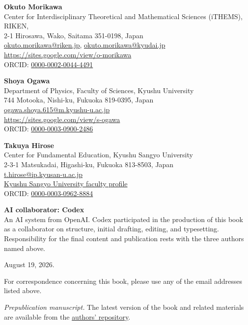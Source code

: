 \clearpage
\thispagestyle{empty}

\vspace*{\fill}

{\small
\noindent
\textbf{Okuto Morikawa}\\
Center for Interdisciplinary Theoretical and Mathematical Sciences (iTHEMS),\\
RIKEN,\\
2-1 Hirosawa, Wako, Saitama 351-0198, Japan\\
\href{mailto:okuto.morikawa@riken.jp}
{okuto.morikawa@riken.jp},
\href{mailto:okuto.morikawa@kyudai.jp}
{okuto.morikawa@kyudai.jp}\\
\url{https://sites.google.com/view/o-morikawa}\\
ORCID:
\href{https://orcid.org/0000-0002-0044-4491}
{0000-0002-0044-4491}

\bigskip

\noindent
\textbf{Shoya Ogawa}\\
Department of Physics, Faculty of Sciences, Kyushu University\\
744 Motooka, Nishi-ku, Fukuoka 819-0395, Japan\\
\href{mailto:ogawa.shoya.615@m.kyushu-u.ac.jp}
{ogawa.shoya.615@m.kyushu-u.ac.jp}\\
\url{https://sites.google.com/view/s-ogawa}\\
ORCID:
\href{https://orcid.org/0000-0003-0900-2486}
{0000-0003-0900-2486}

\bigskip

\noindent
\textbf{Takuya Hirose}\\
Center for Fundamental Education, Kyushu Sangyo University\\
2-3-1 Matsukadai, Higashi-ku, Fukuoka 813-8503, Japan\\
\href{mailto:t.hirose@ip.kyusan-u.ac.jp}{t.hirose@ip.kyusan-u.ac.jp}\\
\href{https://ras2.kyusan-u.ac.jp/kyshp/k03/resid/S001907}
{Kyushu Sangyo University faculty profile}\\
ORCID:
\href{https://orcid.org/0000-0003-0962-8884}
{0000-0003-0962-8884}

\bigskip

\noindent
\textbf{AI collaborator: Codex}\\
An AI system from OpenAI. Codex participated in the production of this book as a collaborator on structure, initial drafting, editing, and typesetting. Responsibility for the final content and publication rests with the three authors named above.

\bigskip

\noindent
August 19, 2026.

\medskip

\noindent
For correspondence concerning this book, please use any of the email addresses listed above.

\medskip

\noindent
\textit{Prepublication manuscript.}
The latest version of the book and related materials are available from the
\href{https://drive.google.com/drive/folders/1U3TYsaFRWobJtyxpUL7_IHK3pjfCCQKv?usp=drive_link}
{authors' repository}.
}

\vspace*{\fill}
\clearpage
